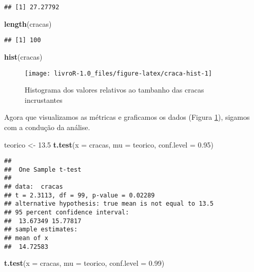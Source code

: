 \documentclass[14pt,titlepage, oneside, openany, a4paper]{book}
\newenvironment{Shaded}{\begin{snugshade}}{\end{snugshade}}
\newcommand{\DataTypeTok}[1]{\textcolor[rgb]{0.13,0.29,0.53}{#1}}
\newcommand{\FloatTok}[1]{\textcolor[rgb]{0.00,0.00,0.81}{#1}}
\newcommand{\KeywordTok}[1]{\textcolor[rgb]{0.13,0.29,0.53}{\textbf{#1}}}
\newcommand{\NormalTok}[1]{#1}
\newcommand{\StringTok}[1]{\textcolor[rgb]{0.31,0.60,0.02}{#1}}
\begin{document}
\begin{verbatim}
## [1] 27.27792
\end{verbatim}

\begin{Shaded}
\begin{Highlighting}[]
\KeywordTok{length}\NormalTok{(cracas)}
\end{Highlighting}
\end{Shaded}

\begin{verbatim}
## [1] 100
\end{verbatim}

\begin{Shaded}
\begin{Highlighting}[]
\KeywordTok{hist}\NormalTok{(cracas)}
\end{Highlighting}
\end{Shaded}

\begin{figure}[H]
\texttt{[image: livroR-1.0\_files/figure-latex/craca-hist-1]} \caption{Histograma dos valores relativos ao tambanho das cracas incrustantes}\label{fig:craca-hist}
\end{figure}

Agora que visualizamos as métricas e graficamos os dados (Figura \ref{fig:craca-hist}), sigamos com a condução da análise.

\begin{Shaded}
\begin{Highlighting}[]
\NormalTok{teorico <-}\StringTok{ }\FloatTok{13.5}
\KeywordTok{t.test}\NormalTok{(}\DataTypeTok{x =}\NormalTok{ cracas, }\DataTypeTok{mu =}\NormalTok{ teorico, }\DataTypeTok{conf.level =} \FloatTok{0.95}\NormalTok{)}
\end{Highlighting}
\end{Shaded}

\begin{verbatim}
## 
##  One Sample t-test
## 
## data:  cracas
## t = 2.3113, df = 99, p-value = 0.02289
## alternative hypothesis: true mean is not equal to 13.5
## 95 percent confidence interval:
##  13.67349 15.77817
## sample estimates:
## mean of x 
##  14.72583
\end{verbatim}

\begin{Shaded}
\begin{Highlighting}[]
\KeywordTok{t.test}\NormalTok{(}\DataTypeTok{x =}\NormalTok{ cracas, }\DataTypeTok{mu =}\NormalTok{ teorico, }\DataTypeTok{conf.level =} \FloatTok{0.99}\NormalTok{)}
\end{Highlighting}
\end{Shaded}
\end{document}
